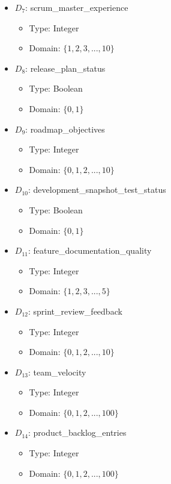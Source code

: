 \documentclass{article}
\begin{document}
\begin{itemize}
\begin{itemize}
        \end{itemize}
    \item $D_7$: scrum\_master\_experience
        \begin{itemize}
            \item Type: Integer
            \item Domain: $\{1,2,3,...,10\}$
        \end{itemize}
    \item $D_8$: release\_plan\_status
        \begin{itemize}
            \item Type: Boolean
            \item Domain: $\{0,1\}$
        \end{itemize}
    \item $D_9$: roadmap\_objectives
        \begin{itemize}
            \item Type: Integer
            \item Domain: $\{0,1,2,...,10\}$
        \end{itemize}
    \item $D_{10}$: development\_snapshot\_test\_status
        \begin{itemize}
            \item Type: Boolean
            \item Domain: $\{0,1\}$
        \end{itemize}
    \item $D_{11}$: feature\_documentation\_quality
        \begin{itemize}
            \item Type: Integer
            \item Domain: $\{1,2,3,...,5\}$
        \end{itemize}
    \item $D_{12}$: sprint\_review\_feedback
        \begin{itemize}
            \item Type: Integer
            \item Domain: $\{0,1,2,...,10\}$
        \end{itemize}
    \item $D_{13}$: team\_velocity
        \begin{itemize}
            \item Type: Integer
            \item Domain: $\{0,1,2,...,100\}$
        \end{itemize}
    \item $D_{14}$: product\_backlog\_entries
        \begin{itemize}
            \item Type: Integer
            \item Domain: $\{0,1,2,...,100\}$
        \end{itemize}
\end{itemize}
\end{document}
